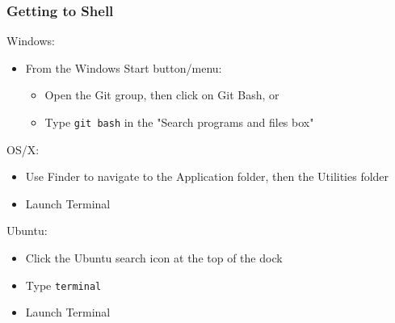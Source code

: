 \documentclass{beamer}
\begin{document}
\begin{frame}
  \frametitle{Getting to Shell}
  Windows:
  \begin{itemize}
    \item From the Windows Start button/menu:
    \begin{itemize}
      \item Open the Git group, then click on Git Bash, or
      \item Type {\tt git bash} in the "Search programs and files box"
    \end{itemize}
  \end{itemize}

  OS/X:
  \begin{itemize}
    \item Use Finder to navigate to the Application folder, then the Utilities folder
    \item Launch Terminal
  \end{itemize}

  Ubuntu:
  \begin{itemize}
    \item Click the Ubuntu search icon at the top of the dock
    \item Type {\tt terminal}
    \item Launch Terminal
  \end{itemize}

\end{frame}
\end{document}
